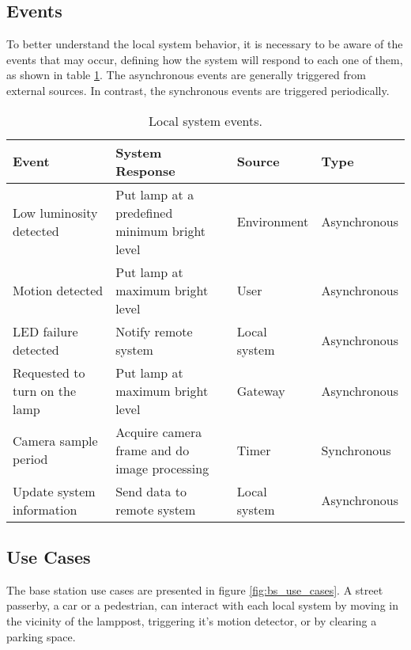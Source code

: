 \subsection{Events}
To better understand the local system behavior, it is necessary to be aware of the events that may occur, defining how the system will respond to each one of them, as shown in table \ref{table:ls_events}. The asynchronous events are generally triggered from external sources. In contrast, the synchronous events are triggered periodically.

\begin{table}[ht]
	\centering
	\resizebox{\columnwidth}{!}
	{

	\begin{tabular}{|m{3cm}|m{5cm}|m{2.4cm}|m{2.4cm}|}
		\hline
		\textbf{Event} & \textbf{System Response} & \textbf{Source} & \textbf{Type}\\
		\hline\hline
		Low luminosity detected & Put lamp at a predefined minimum bright level & Environment & Asynchronous\\
		\hline
		
		Motion detected & Put lamp at maximum bright level & User & Asynchronous\\
		\hline
		
		LED failure detected & Notify remote system & Local system & Asynchronous\\
		\hline
		
		Requested to turn on the lamp & Put lamp at maximum bright level & Gateway & Asynchronous\\
		\hline
		
		Camera sample period & Acquire camera frame and do image processing & Timer & Synchronous\\
		\hline
		
		
		Update system information & Send data to remote system & Local system & Asynchronous\\
		\hline
	\end{tabular}
	}		
	\caption{Local system events.}
	\label{table:ls_events}
\end{table}

\subsection{Use Cases}
The base station use cases are presented in figure \ref{fig:bs_use_cases}. A street passerby, a car or a pedestrian, can interact with each local system by moving in the vicinity of the lamppost, triggering it's motion detector, or by clearing a parking space.

